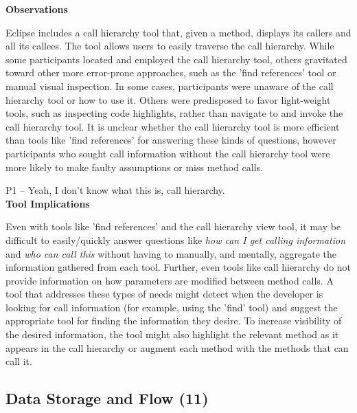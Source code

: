 \documentclass[conference]{IEEEtran}
\begin{document}
\noindent\textbf{Observations}

Eclipse includes a call hierarchy tool that, given a method, displays its callers and all its callees. 
The tool allows users to easily traverse the call hierarchy. 
While some participants located and employed the call hierarchy tool, others gravitated toward other more error-prone approaches, such as the 'find references' tool or manual visual inspection. 
In some cases, participants were unaware of the call hierarchy tool or how to use it. 
Others were predisposed to favor light-weight tools, such as inspecting code highlights, rather than navigate to and invoke the call hierarchy tool.
It is unclear whether the call hierarchy tool is more efficient than tools like 'find references' for answering these kinds of questions, however participants who sought call information without the call hierarchy tool were more likely to make faulty assumptions or miss method calls. 

P1 -- Yeah, I don't know what this is, call hierarchy.
\\

\noindent\textbf{Tool Implications}

Even with tools like 'find references' and the call hierarchy view tool, it may be difficult to easily/quickly answer questions like \emph{how can I get calling information} and \emph{who can call this} without having to manually, and mentally, aggregate the information gathered from each tool. 
Further, even tools like call hierarchy do not provide information on how parameters are modified between method calls. 
A tool that addresses these types of needs might detect when the developer is looking for call information (for example, using the 'find' tool) and suggest the appropriate tool for finding the information they desire. 
To increase visibility of the desired information, the tool might also highlight the relevant method as it appears in the call hierarchy or augment each method with the methods that can call it.



\noindent\subsection{\textbf{Data Storage and Flow (11)}}\label{dsf}
\end{document}
